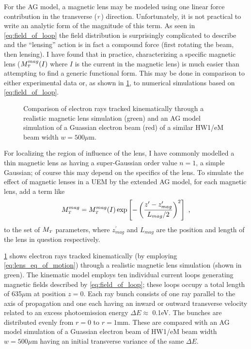 For the AG model, a magnetic lens may be modeled using one linear force contribution in the transverse ($ {\scriptscriptstyle T} $) direction.
Unfortunately, it is not practical to write an analytic form of the magnitude of this term.
As seen in \ref{eq:field_of_loop} the field distribution is surprisingly complicated to describe and the ``lensing'' action is in fact a compound force (first rotating the beam, then lensing).
I have found that in practice, characterizing a specific magnetic lens ($M_{{\scriptscriptstyle T}}^{mag}(I)$ where $I$ is the current in the magnetic lens) is much easier than attempting to find a generic functional form.
This may be done in comparison to either experimental data or, as shown in \ref{fig:mag_lens_loops}, to numerical simulations based on \ref{eq:field_of_loop}.

\begin{figure}
  \centering
  
  \caption[Comparison of the AG model and a kinematic model of a magnetic lens]{
    Comparison of electron rays tracked kinematically through a realistic magnetic lens simulation (green) and an AG model simulation of a Guassian electron beam (red) of a similar HW1/eM beam width $ w = 500 \mu\text{m} $.
  }
  \label{fig:mag_lens_loops}
\end{figure}

For localizing the region of influence of the lens, I have commonly modelled a thin magnetic lens as having a super-Gaussian order value $n=1$, a simple Gaussian; of course this may depend on the specifics of the lens.
To simulate the effect of magnetic lenses in a UEM by the extended AG model, for each magnetic lens, add a term like
\begin{equation} \label{eq:reg_of_influence}
  M_{{\scriptscriptstyle T}}^{mag} = M_{{\scriptscriptstyle T}}^{mag}(I) \exp \left [ - \left (  \frac{ z^{\prime} - z_{mag}^{\prime} }{ L_{mag} / 2 } \right )^{ 2 } \right ] \text{ ,}
\end{equation}
to the set of $M_{{\scriptscriptstyle T}}$ parameters, where $z_{mag}^{\prime}$ and $L_{mag}$ are the position and length of the lens in question respectively.

\ref{fig:mag_lens_loops} shows electron rays tracked kinematically (by employing \ref{eq:lens_eq_of_motion}) through a realistic magnetic lens simulation (shown in green).
The kinematic model employs ten individual current loops generating magnetic fields described by \ref{eq:field_of_loop}; these loops occupy a total length of 635$\mu$m at position $z=0$.
Each ray bunch consists of one ray parallel to the axis of propagation and one each having an inward or outward transverse velocity related to an excess photoemission energy $\Delta E \approx $ 0.1eV.
The bunches are distributed evenly from $r=0$ to $r = 1$mm.
These are compared with an AG model simulation of a Guassian electron beam of HW1/eM beam width $ w = 500 \mu\text{m} $ having an initial transverse variance of the same $\Delta E$.

